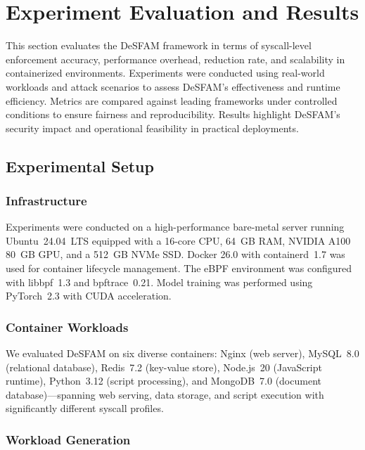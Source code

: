 \section{Experiment Evaluation and Results}
\label{sec:evaluation}

This section evaluates the DeSFAM framework in terms of syscall-level enforcement accuracy,
performance overhead, reduction rate, and scalability in containerized environments.
Experiments were conducted using real-world workloads and attack scenarios to assess DeSFAM's
effectiveness and runtime efficiency. Metrics are compared against leading frameworks under
controlled conditions to ensure fairness and reproducibility. Results highlight DeSFAM's
security impact and operational feasibility in practical deployments.

\subsection{Experimental Setup}
\label{subsec:experimental_setup}

\subsubsection{Infrastructure}
\label{subsubsec:infrastructure}

Experiments were conducted on a high-performance bare-metal server running Ubuntu~24.04~LTS
equipped with a 16-core CPU, 64~GB RAM, NVIDIA A100 80~GB GPU, and a 512~GB NVMe SSD. Docker
26.0 with containerd~1.7 was used for container lifecycle management. The eBPF environment was
configured with libbpf~1.3 and bpftrace~0.21. Model training was performed using PyTorch~2.3
with CUDA acceleration.

\subsubsection{Container Workloads}
\label{subsubsec:container_workloads}

We evaluated DeSFAM on six diverse containers: Nginx (web server), MySQL~8.0 (relational
database), Redis~7.2 (key-value store), Node.js~20 (JavaScript runtime), Python~3.12 (script
processing), and MongoDB~7.0 (document database)---spanning web serving, data storage, and
script execution with significantly different syscall profiles.

\subsubsection{Workload Generation}
\label{subsubsec:workload_generation}

